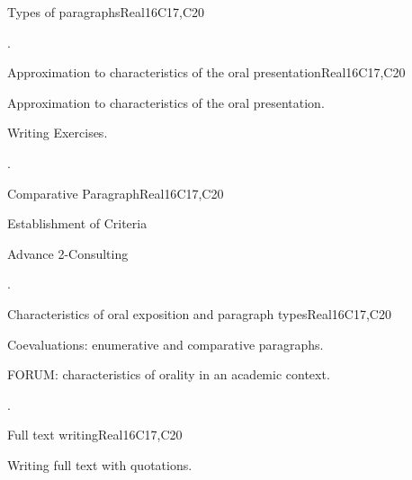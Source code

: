 \begin{syllabus}
\begin{unit}{Types of paragraphs}{}{Real}{16}{C17,C20}
  \begin{learningoutcomes}
   \item .%
  \end{learningoutcomes}
\end{unit}

\begin{unit}{Approximation to characteristics of the oral presentation}{}{Real}{16}{C17,C20}
  \begin{topics}
      \item Approximation to characteristics of the oral presentation.
      \item Writing Exercises.
  \end{topics}

  \begin{learningoutcomes}
   \item .%
  \end{learningoutcomes}
\end{unit}


\begin{unit}{Comparative Paragraph}{}{Real}{16}{C17,C20}
  \begin{topics}
      \item Establishment of Criteria
      \item Advance 2-Consulting
  \end{topics}

  \begin{learningoutcomes}
   \item .%
  \end{learningoutcomes}
\end{unit}

\begin{unit}{Characteristics of oral exposition and paragraph types}{}{Real}{16}{C17,C20}
  \begin{topics}
      \item Coevaluations: enumerative and comparative paragraphs.
      \item FORUM: characteristics of orality in an academic context.
  \end{topics}

  \begin{learningoutcomes}
   \item .%
  \end{learningoutcomes}
\end{unit}

\begin{unit}{Full text writing}{}{Real}{16}{C17,C20}
  \begin{topics}
      \item Writing full text with quotations.
  \end{topics}


\end{unit}
\end{syllabus}
